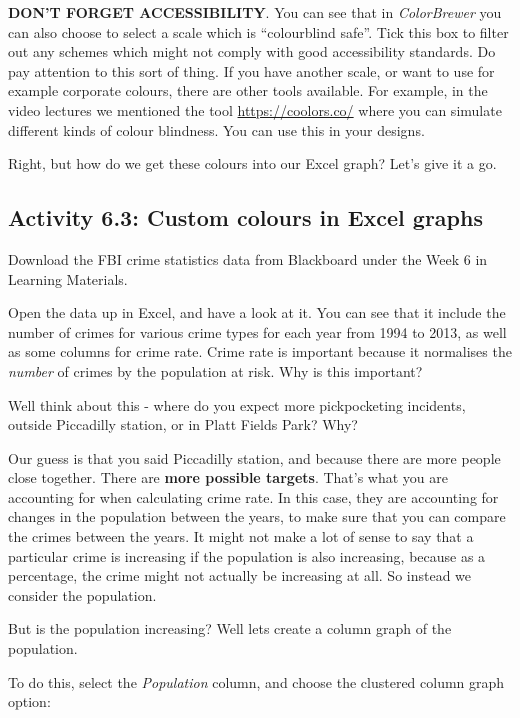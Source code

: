\documentclass[
]{book}
\begin{document}
\textbf{DON'T FORGET ACCESSIBILITY}. You can see that in \emph{ColorBrewer} you can also choose to select a scale which is ``colourblind safe''. Tick this box to filter out any schemes which might not comply with good accessibility standards. Do pay attention to this sort of thing. If you have another scale, or want to use for example corporate colours, there are other tools available. For example, in the video lectures we mentioned the tool \url{https://coolors.co/} where you can simulate different kinds of colour blindness. You can use this in your designs.

Right, but how do we get these colours into our Excel graph? Let's give it a go.

\hypertarget{activity-6.3-custom-colours-in-excel-graphs}{%
\subsection{Activity 6.3: Custom colours in Excel graphs}\label{activity-6.3-custom-colours-in-excel-graphs}}

Download the FBI crime statistics data from Blackboard under the Week 6 in Learning Materials.

Open the data up in Excel, and have a look at it. You can see that it include the number of crimes for various crime types for each year from 1994 to 2013, as well as some columns for crime rate. Crime rate is important because it normalises the \emph{number} of crimes by the population at risk. Why is this important?

Well think about this - where do you expect more pickpocketing incidents, outside Piccadilly station, or in Platt Fields Park? Why?

Our guess is that you said Piccadilly station, and because there are more people close together. There are \textbf{more possible targets}. That's what you are accounting for when calculating crime rate. In this case, they are accounting for changes in the population between the years, to make sure that you can compare the crimes between the years. It might not make a lot of sense to say that a particular crime is increasing if the population is also increasing, because as a percentage, the crime might not actually be increasing at all. So instead we consider the population.

But is the population increasing? Well lets create a column graph of the population.

To do this, select the \emph{Population} column, and choose the clustered column graph option:
\end{document}

